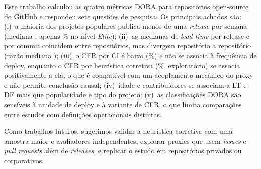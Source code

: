 \documentclass[12pt]{article}
\begin{document}
Este trabalho calculou as quatro métricas DORA para \NTotal{} repositórios open-source do GitHub
e respondeu sete questões de pesquisa. Os principais achados são: (i)~a maioria dos projetos
populares publica menos de uma \textit{release} por semana (mediana \NDfMed{}; apenas \NDfClasseElite\% no
nível \textit{Elite}); (ii)~as medianas de \textit{lead time} por release e por commit coincidem
entre repositórios, mas divergem repositório a repositório (razão mediana \NRazMed{}); (iii)~o CFR por CI é
baixo (\NCfraMed\%) e não se associa à frequência de deploy, enquanto o CFR por heurística corretiva
(\NCfrbMed\%, exploratório) se associa positivamente a ela, o que é compatível com um acoplamento mecânico
do proxy e não permite conclusão causal; (iv)~idade e contribuidores se associam a LT e DF mais que
popularidade e tipo do projeto; (v)~as classificações DORA são sensíveis à unidade de deploy e à variante de
CFR, o que limita comparações entre estudos com definições operacionais distintas.

Como trabalhos futuros, sugerimos validar a heurística corretiva com uma amostra maior e
avaliadores independentes, explorar proxies que usem \textit{issues} e \textit{pull requests}
além de \textit{releases}, e replicar o estudo em repositórios privados ou corporativos.



\end{document}
